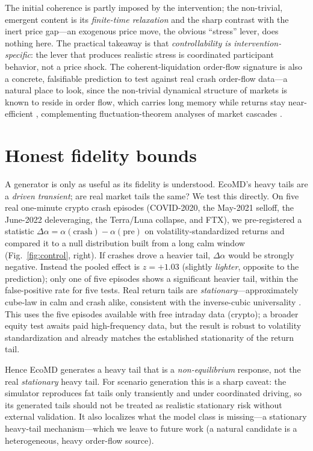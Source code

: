 \documentclass{article}
\begin{document}
The initial coherence is partly imposed by the intervention; the non-trivial, emergent content is its
\emph{finite-time relaxation} and the sharp contrast with the inert price gap---an exogenous price
move, the obvious ``stress'' lever, does nothing here. The practical takeaway is that
\emph{controllability is intervention-specific}: the lever that produces realistic stress is
coordinated participant behavior, not a price shock. The coherent-liquidation order-flow signature is
also a concrete, falsifiable prediction to test against real crash order-flow data---a natural place to
look, since the non-trivial dynamical structure of markets is known to reside in order flow, which
carries long memory while returns stay near-efficient \citep{lillo2004,cont2014,toth2011}, complementing
fluctuation-theorem analyses of market cascades \citep{maskawa2025}.

\section{Honest fidelity bounds}\label{sec:fidelity}
A generator is only as useful as its fidelity is understood. EcoMD's heavy tails are a \emph{driven
transient}; are real market tails the same? We test this directly. On five real one-minute crypto
crash episodes (COVID-2020, the May-2021 selloff, the June-2022 deleveraging, the Terra/Luna
collapse, and FTX), we pre-registered a statistic $\Delta\alpha = \alpha(\text{crash})-\alpha(\text{pre})$
on volatility-standardized returns and compared it to a null distribution built from a long calm
window (Fig.~\ref{fig:control}, right). If crashes drove a heavier tail, $\Delta\alpha$ would be
strongly negative. Instead the pooled effect is $z=+1.03$ (slightly \emph{lighter}, opposite to the
prediction); only one of five episodes shows a significant heavier tail, within the false-positive
rate for five tests. Real return tails are \emph{stationary}---approximately cube-law in calm and
crash alike, consistent with the inverse-cubic universality \citep{gabaix2003,plerou1999,toth2011}.
This uses the five episodes available with free intraday data (crypto); a broader equity test awaits
paid high-frequency data, but the result is robust to volatility standardization and already matches
the established stationarity of the return tail.

Hence EcoMD generates a heavy tail that is a \emph{non-equilibrium} response, not the real
\emph{stationary} heavy tail. For scenario generation this is a sharp caveat: the simulator reproduces
fat tails only transiently and under coordinated driving, so its generated tails should not be treated
as realistic stationary risk without external validation. It also localizes what the model class is
missing---a stationary heavy-tail mechanism---which we leave to future work (a natural candidate is a
heterogeneous, heavy order-flow source).
\end{document}
